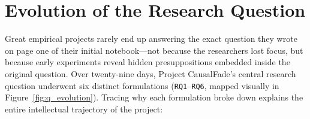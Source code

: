 \chapter{Evolution of the Research Question}\label{ch:rq_evolution}

Great empirical projects rarely end up answering the exact question they wrote on page one of their initial notebook---not because the researchers lost focus, but because early experiments reveal hidden presuppositions embedded inside the original question. Over twenty-nine days, Project CausalFade's central research question underwent six distinct formulations (\texttt{RQ1}--\texttt{RQ6}, mapped visually in Figure~\ref{fig:q_evolution}). Tracing why each formulation broke down explains the entire intellectual trajectory of the project:

